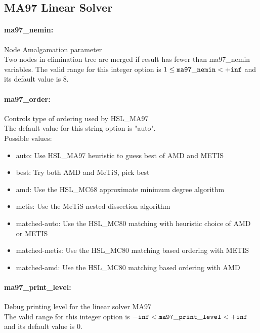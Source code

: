 \subsection{MA97 Linear Solver}
\label{sec:MA97LinearSolver}
\paragraph{ma97\_nemin:}\label{opt:ma97_nemin} Node Amalgamation parameter \\
 Two nodes in elimination tree are merged if result has fewer than ma97\_nemin variables. The valid range for this integer option is
$1 \le {\tt ma97\_nemin } <  {\tt +inf}$
and its default value is $8$.


\paragraph{ma97\_order:}\label{opt:ma97_order} Controls type of ordering used by HSL\_MA97 \\
 The default value for this string option is "auto".
\\ 
Possible values:
\begin{itemize}
   \item auto: Use HSL\_MA97 heuristic to guess best of AMD and METIS
   \item best: Try both AMD and MeTiS, pick best
   \item amd: Use the HSL\_MC68 approximate minimum degree algorithm
   \item metis: Use the MeTiS nested dissection algorithm
   \item matched-auto: Use the HSL\_MC80 matching with heuristic choice of AMD or METIS
   \item matched-metis: Use the HSL\_MC80 matching based ordering with METIS
   \item matched-amd: Use the HSL\_MC80 matching based ordering with AMD
\end{itemize}

\paragraph{ma97\_print\_level:}\label{opt:ma97_print_level} Debug printing level for the linear solver MA97 \\
 The valid range for this integer option is
${\tt -inf} <  {\tt ma97\_print\_level } <  {\tt +inf}$
and its default value is $0$.



